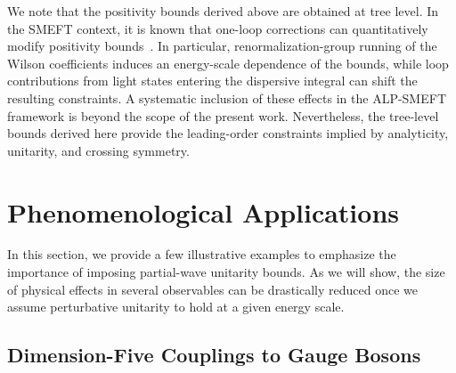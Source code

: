 We note that the positivity bounds derived above are obtained at tree level. In the SMEFT context, it is known that one-loop corrections can
quantitatively modify
positivity bounds~\cite{Bellazzini:2020cot,Bellazzini:2021oaj,Chala:2021wpj,Li:2022aby,Ye:2024rzr}. In particular,
renormalization-group running of
the Wilson coefficients induces an energy-scale dependence of the
bounds, while loop
contributions from light states entering the dispersive integral can
shift the resulting
constraints. A systematic inclusion of these effects in the ALP-SMEFT
framework is beyond
the scope of the present work. Nevertheless, the tree-level bounds
derived here provide
the leading-order constraints implied by analyticity, unitarity, and
crossing symmetry.

\section{Phenomenological Applications\label{sec:ALPUBpheno}}

In this section, we provide a few illustrative examples to emphasize the importance of imposing partial-wave unitarity bounds. As we will show, the size of physical effects in several observables can be drastically reduced once we assume perturbative unitarity to hold at a given energy scale.


\subsection{Dimension-Five Couplings to Gauge Bosons}

